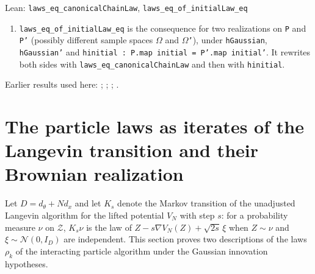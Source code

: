 \documentclass[11pt,a4paper]{report}
\begin{document}
\begin{leanbox}{Lean: \texttt{laws\_\allowbreak{}eq\_\allowbreak{}canonicalChainLaw}, \texttt{laws\_\allowbreak{}eq\_\allowbreak{}of\_\allowbreak{}initialLaw\_\allowbreak{}eq}}
\begin{enumerate}
\begin{itemize}
\item \texttt{h\allowbreak{}Gaussian.\allowbreak{}noise\allowbreak{}Path\_\allowbreak{}law P initial noise} replaces the path law by \(\mathcal G\).

\end{itemize}


\item \texttt{laws\_\allowbreak{}eq\_\allowbreak{}of\_\allowbreak{}initial\allowbreak{}Law\_\allowbreak{}eq} is the consequence for two realizations on \texttt{P} and \texttt{P'} (possibly different sample spaces \texttt{\ensuremath{\Omega}} and \texttt{\ensuremath{\Omega}'}), under \texttt{h\allowbreak{}Gaussian}, \texttt{h\allowbreak{}Gaussian'} and \texttt{hinitial : P.\allowbreak{}map initial = P'.\allowbreak{}map initial'}. It rewrites both sides with \texttt{laws\_\allowbreak{}eq\_\allowbreak{}canonical\allowbreak{}Chain\allowbreak{}Law} and then with \texttt{hinitial}.

\end{enumerate}
\end{leanbox}


Earlier results used here: \cite[Section~3.20.5]{LangevinLean2026ULASC}; \cite[Section~3.20.7]{LangevinLean2026ULASC}; \cite[Section~3.23.1]{LangevinLean2026ULASC}; \cite[Section~3.23.2]{LangevinLean2026ULASC}.
\section{\texorpdfstring{The particle laws as iterates of the Langevin transition and their Brownian realization}{The particle laws as iterates of the Langevin transition and their Brownian realization}}
\label{proof-module-IPLA-ULAAdapter-lean}


Let \(D=d_\theta+Nd_x\) and let \(K_s\) denote the Markov transition of the unadjusted Langevin algorithm for the lifted potential \(V_N\) with step \(s\): for a probability measure \(\nu\) on \(\mathcal Z\), \(K_s\nu\) is the law of \(Z-s\nabla V_N(Z)+\sqrt{2s}\,\xi\) when \(Z\sim\nu\) and \(\xi\sim\mathcal N(0,I_D)\) are independent. This section proves two descriptions of the laws \(\rho_k\) of the interacting particle algorithm under the Gaussian innovation hypotheses.
\end{document}
